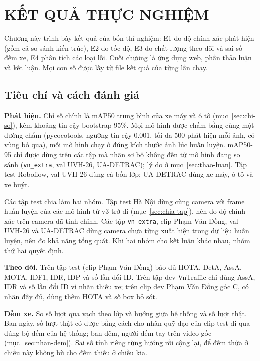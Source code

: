 \chapter{KẾT QUẢ THỰC NGHIỆM}
\label{chap:ketqua}

Chương này trình bày kết quả của bốn thí nghiệm: E1 đo độ chính xác phát hiện (gồm cả so sánh kiến trúc), E2 đo tốc độ,
E3 đo chất lượng theo dõi và sai số đếm xe, E4 phân tích các loại lỗi. Cuối chương là ứng dụng web, phần thảo luận và
kết luận. Mọi con số được lấy từ file kết quả của từng lần chạy.

\section{Tiêu chí và cách đánh giá}

\textbf{Phát hiện.} Chỉ số chính là mAP50 trung bình của xe máy và ô tô (mục~\ref{sec:chi-so}), kèm khoảng tin cậy
bootstrap 95\%. Mọi mô hình được chấm bằng cùng một đường chấm (pycocotools, ngưỡng tin cậy 0.001, tối đa 500 phát hiện
mỗi ảnh, có vùng bỏ qua), mỗi mô hình chạy ở đúng kích thước ảnh lúc huấn luyện. mAP50-95 chỉ được dùng trên các tập
mà nhãn sơ bộ không đến từ mô hình đang so sánh (\texttt{vn\_extra}, val UVH-26, UA-DETRAC); lý do ở
mục~\ref{sec:thao-luan}. Tập test Roboflow, val UVH-26 dùng cả bốn lớp; UA-DETRAC dùng xe máy, ô tô và xe buýt.

Các tập test chia làm hai nhóm. Tập test Hà Nội dùng cùng camera với frame huấn luyện của các mô hình từ v3
trở đi (mục~\ref{sec:chia-tap}), nên đo độ chính xác trên camera đã tinh chỉnh. Các tập \texttt{vn\_extra}, clip Phạm Văn Đồng,
val UVH-26 và UA-DETRAC dùng camera chưa từng xuất hiện trong dữ liệu huấn luyện, nên đo khả năng tổng quát.
Khi hai nhóm cho kết luận khác nhau, nhóm thứ hai quyết định.

\textbf{Theo dõi.} Trên tập test (clip Phạm Văn Đồng) báo đủ HOTA, DetA, AssA, MOTA, IDF1, IDR, IDP và số lần đổi ID.
Trên tập dev VnTraffic chỉ dùng AssA, IDR và số lần đổi ID vì nhãn thiếu xe; trên clip dev Phạm Văn Đồng góc C, có nhãn
đầy đủ, dùng thêm HOTA và số box bỏ sót.

\textbf{Đếm xe.} So số lượt qua vạch theo lớp và hướng giữa hệ thống và số lượt thật. Ban ngày, số lượt thật có được
bằng cách cho nhãn quỹ đạo của clip test đi qua đúng bộ đếm của hệ thống; ban đêm, người đếm tay trên video gốc
(mục~\ref{sec:nhan-dem}). Sai số tính riêng từng hướng rồi cộng lại, để đếm thừa ở chiều này không bù cho đếm thiếu ở
chiều kia.

